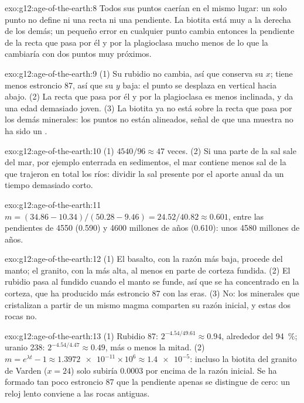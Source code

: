 \begin{solution}{exo:g12:age-of-the-earth:8}
Todos sus puntos caerían en el mismo lugar: un solo punto no define ni una
recta ni una pendiente. La biotita está muy a la derecha de los demás; un
pequeño error en cualquier punto cambia entonces la pendiente de la recta que
pasa por él y por la plagioclasa mucho menos de lo que la cambiaría con dos
puntos muy próximos.
\end{solution}

\begin{solution}{exo:g12:age-of-the-earth:9}
(1) Su rubidio no cambia, así que conserva su $x$; tiene menos estroncio 87,
así que su $y$ baja: el punto se desplaza en vertical hacia abajo. (2) La
recta que pasa por él y por la plagioclasa es menos inclinada, y da una edad
demasiado joven. (3) La biotita ya no está sobre la recta que pasa por los
demás minerales: los puntos no están alineados, señal de que una muestra no ha
sido un .
\end{solution}

\begin{solution}{exo:g12:age-of-the-earth:10}
(1) $4540/96 \approx 47$ veces. (2) Si una parte de la sal sale del mar, por
ejemplo enterrada en sedimentos, el mar contiene menos sal de la que trajeron
en total los ríos: dividir la sal presente por el aporte anual da un tiempo
demasiado corto.
\end{solution}

\begin{solution}{exo:g12:age-of-the-earth:11}
$m = (34.86 - 10.34)/(50.28 - 9.46) = 24.52/40.82 \approx 0.601$, entre las
pendientes de 4550 (0.590) y 4600 millones de años (0.610): unos 4580
millones de años.
\end{solution}

\begin{solution}{exo:g12:age-of-the-earth:12}
(1) El basalto, con la razón más baja, procede del manto; el granito, con la
más alta, al menos en parte de corteza fundida. (2) El rubidio pasa al
fundido cuando el manto se funde, así que se ha concentrado en la corteza, que
ha producido más estroncio 87 con las eras. (3) No: los minerales que
cristalizan a partir de un mismo magma comparten su razón inicial, y estas dos
rocas no.
\end{solution}

\begin{solution}{exo:g12:age-of-the-earth:13}
(1) Rubidio 87: $2^{-4.54/49.61} \approx 0.94$, alrededor del
\qty{94}{\percent}; uranio 238: $2^{-4.54/4.47} \approx 0.49$, más o menos la
mitad. (2) $m =
e^{\lambda t} - 1 \approx \num{1.3972e-11} \times 10^6 \approx
\num{1.4e-5}$: incluso la biotita del granito de Varden ($x = 24$) solo
subiría $0.0003$ por encima de la razón inicial. Se ha formado tan poco
estroncio 87 que la pendiente apenas se distingue de cero: un reloj lento
conviene a las rocas antiguas.
\end{solution}

